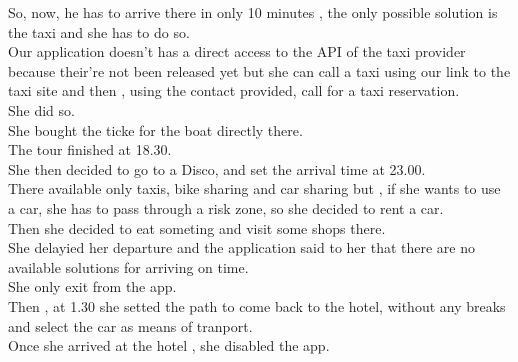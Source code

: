 \documentclass[a4paper,leqno]{book}
\begin{document}
So, now, he has to arrive there in only 10 minutes , the only possible solution is the taxi and she has to do so.\\
Our application doesn't has a direct access to the API of the taxi provider because their're not been released yet but she can call a taxi using our link to the taxi site and then , using the contact provided, call for a taxi reservation.\\
She did so.\\
She bought the ticke for the boat directly there.\\
The tour finished at 18.30.\\
She then decided to go to a Disco, and set the arrival time at 23.00.\\
There available only taxis, bike sharing and car sharing but , if she wants to use a car, she has to pass through a risk zone, so she decided to rent a car.\\
Then she decided to eat someting and visit some shops there.\\
She delayied her departure and the application said to her that there are no available solutions for arriving on time.\\
She only exit from the app.\\
Then , at 1.30 she setted the path to come back to the hotel, without any breaks and select the car as means of tranport.\\
Once she arrived at the hotel , she disabled the app.\\
\end{document}
